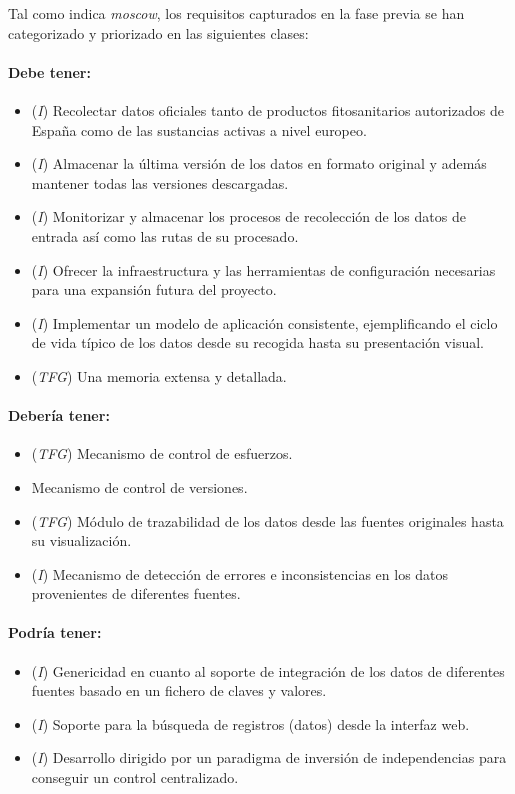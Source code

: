 Tal como indica \textit{\gls{moscow}}, los requisitos capturados en la fase previa se han categorizado y priorizado en las siguientes clases: 

\paragraph*{Debe tener:} 
\begin{itemize}
\item (\textit{I}) Recolectar datos oficiales tanto de productos fitosanitarios autorizados de España como de las sustancias activas a nivel europeo. 
\item (\textit{I}) Almacenar la última versión de los datos en formato original y además mantener todas las versiones descargadas. 
\item (\textit{I}) Monitorizar y almacenar los procesos de recolección de los datos de entrada así como las rutas de su procesado.
\item (\textit{I}) Ofrecer la infraestructura y las herramientas de configuración necesarias para una expansión futura del proyecto. 
\item (\textit{I}) Implementar un modelo de aplicación consistente, ejemplificando el ciclo de vida típico de los datos desde su recogida hasta su presentación visual. 
\item (\textit{TFG}) Una memoria extensa y detallada. 
\end{itemize}

\paragraph*{Debería tener:} 
\begin{itemize}
\item (\textit{TFG}) Mecanismo de control de esfuerzos.
\item Mecanismo de control de versiones.
\item (\textit{TFG}) Módulo de trazabilidad de los datos desde las fuentes originales hasta su visualización. 
\item (\textit{I}) Mecanismo de detección de errores e inconsistencias en los datos provenientes de diferentes fuentes. 
\end{itemize}


\paragraph*{Podría tener:} 
\begin{itemize}
\item (\textit{I}) Genericidad en cuanto al soporte de integración de los datos de diferentes fuentes basado en un fichero de claves y valores. 
\item (\textit{I}) Soporte para la búsqueda de registros (datos) desde la interfaz web. 
\item (\textit{I}) Desarrollo dirigido por un paradigma de inversión de independencias para conseguir un control centralizado.
\end{itemize}

